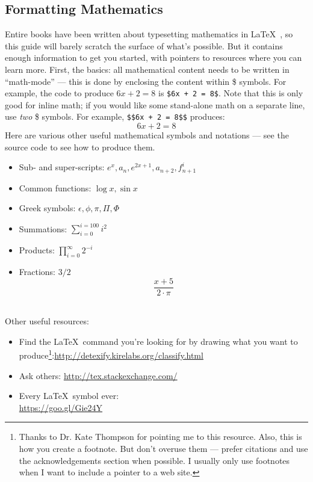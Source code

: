 \subsection{Formatting Mathematics}
\label{subsec:math}

Entire books have been written about typesetting mathematics in
\LaTeX~, so this guide will barely scratch the surface of what's
possible. But it contains enough information to get you started, with
pointers to resources where you can learn more. First, the basics: all
mathematical content needs to be written in ``math-mode'' --- this is
done by enclosing the content within \$ symbols. For example, the code
to produce $6x + 2 = 8$ is \texttt{\$6x + 2 = 8\$}. Note that this is
only good for inline math; if you would like some stand-alone math on
a separate line, use \emph{two} \$ symbols. For example,
\texttt{\$\$6x + 2 = 8\$\$} produces: $$6x+2 = 8$$ Here are various
other useful mathematical symbols and notations --- see the source
code to see how to produce them.

\begin{itemize}
  \item Sub- and super-scripts: $e^{x}, a_{n}, e^{2x+1}, a_{n+2}, f^{i}_{n+1}$
  \item Common functions: $\log{x}, \sin{x}$
  \item Greek symbols: $\epsilon, \phi, \pi, \Pi, \Phi$ %
  \item Summations: $\sum_{i=0}^{i=100} i^{2}$ %
  \item Products: $\prod_{i=0}^{\infty} 2^{-i}$
  \item Fractions: $3/2$ %
    $$\frac{x + 5}{2 \cdot \pi}$$\\ %
\end{itemize}

\noindent Other useful resources:
\begin{itemize}
\item Find the \LaTeX~command you're looking for by drawing what you
  want to produce\footnote{Thanks to Dr. Kate Thompson for pointing me
    to this resource. Also, this is how you create a footnote. But
    don't overuse them --- prefer citations and use the
    acknowledgements section when possible. I usually only use
    footnotes when I want to include a pointer to a web
    site.}:\url{http://detexify.kirelabs.org/classify.html}
\item Ask others: \url{http://tex.stackexchange.com/}
\item Every \LaTeX~symbol ever:\\ \url{https://goo.gl/Gie24Y}

\end{itemize}


